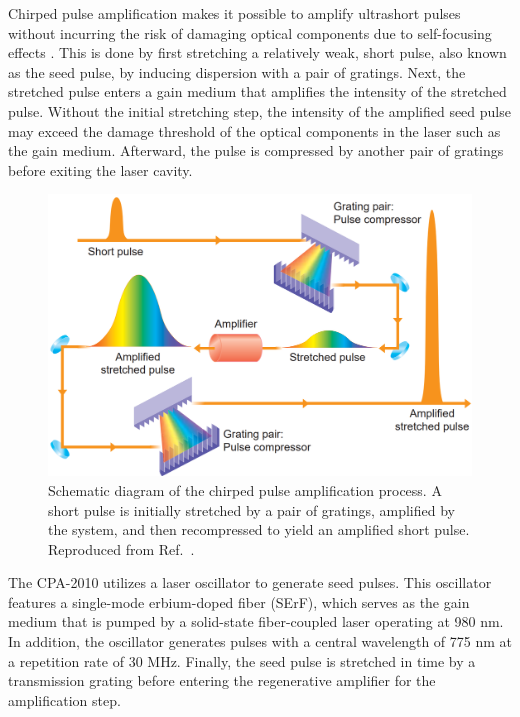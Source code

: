 Chirped pulse amplification makes it possible to amplify ultrashort pulses without incurring the risk of damaging optical components due to self-focusing effects \cite{strickland1985compression}. This is done by first stretching a relatively weak, short pulse, also known as the seed pulse, by inducing dispersion with a pair of gratings. Next, the stretched pulse enters a gain medium that amplifies the intensity of the stretched pulse. Without the initial stretching step, the intensity of the amplified seed pulse may exceed the damage threshold of the optical components in the laser such as the gain medium. Afterward, the pulse is compressed by another pair of gratings before exiting the laser cavity.

\begin{figure}[ht]
	\centering
	\includegraphics[scale=0.31]{images/chapter_methods/cpa_process_service}
	\caption{Schematic diagram of the chirped pulse amplification process. A short pulse is initially stretched by a pair of gratings, amplified by the system, and then recompressed to yield an amplified short pulse. Reproduced from Ref.\ \cite{service154}.}
	\label{fig:cpa_process}
\end{figure}

The CPA-2010 utilizes a laser oscillator to generate seed pulses. This oscillator features a single-mode erbium-doped fiber (SErF), which serves as the gain medium that is pumped by a solid-state fiber-coupled laser operating at 980 nm. In addition, the oscillator generates pulses with a central wavelength of 775 nm at a repetition rate of 30 MHz. Finally, the seed pulse is stretched in time by a transmission grating before entering the regenerative amplifier for the amplification step.


